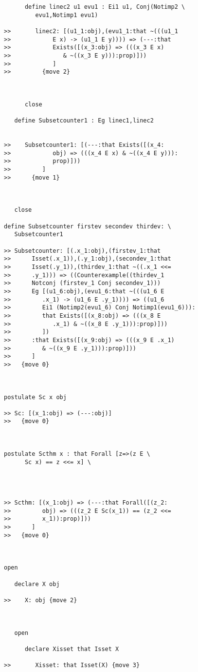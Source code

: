 \documentclass[12pt]{article}
\begin{document}
\begin{verbatim}
      define linec2 u1 evu1 : Ei1 u1, Conj(Notimp2 \
         evu1,Notimp1 evu1)

>>       linec2: [(u1_1:obj),(evu1_1:that ~(((u1_1
>>            E x) -> (u1_1 E y)))) => (---:that
>>            Exists([(x_3:obj) => (((x_3 E x)
>>               & ~((x_3 E y))):prop)]))
>>            ]
>>         {move 2}



      close

   define Subsetcounter1 : Eg linec1,linec2


>>    Subsetcounter1: [(---:that Exists([(x_4:
>>            obj) => (((x_4 E x) & ~((x_4 E y))):
>>            prop)]))
>>         ]
>>      {move 1}



   close

define Subsetcounter firstev secondev thirdev: \
   Subsetcounter1

>> Subsetcounter: [(.x_1:obj),(firstev_1:that
>>      Isset(.x_1)),(.y_1:obj),(secondev_1:that
>>      Isset(.y_1)),(thirdev_1:that ~((.x_1 <<=
>>      .y_1))) => ((Counterexample((thirdev_1
>>      Notconj (firstev_1 Conj secondev_1)))
>>      Eg [(u1_6:obj),(evu1_6:that ~(((u1_6 E
>>         .x_1) -> (u1_6 E .y_1)))) => ((u1_6
>>         Ei1 (Notimp2(evu1_6) Conj Notimp1(evu1_6))):
>>         that Exists([(x_8:obj) => (((x_8 E
>>            .x_1) & ~((x_8 E .y_1))):prop)]))
>>         ])
>>      :that Exists([(x_9:obj) => (((x_9 E .x_1)
>>         & ~((x_9 E .y_1))):prop)]))
>>      ]
>>   {move 0}



postulate Sc x obj

>> Sc: [(x_1:obj) => (---:obj)]
>>   {move 0}



postulate Scthm x : that Forall [z=>(z E \
      Sc x) == z <<= x] \
   



>> Scthm: [(x_1:obj) => (---:that Forall([(z_2:
>>         obj) => (((z_2 E Sc(x_1)) == (z_2 <<=
>>         x_1)):prop)]))
>>      ]
>>   {move 0}



open

   declare X obj

>>    X: obj {move 2}



   open

      declare Xisset that Isset X

>>       Xisset: that Isset(X) {move 3}




\end{verbatim}
\end{document}
